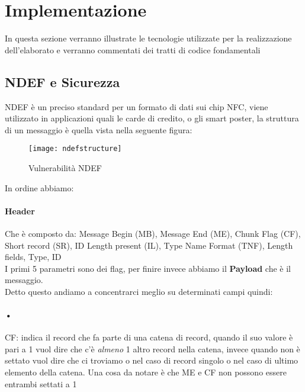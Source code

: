 \section{Implementazione}

\hspace{\parindent}In questa sezione verranno illustrate le tecnologie utilizzate per la realizzazione dell'elaborato e verranno commentati dei tratti di codice fondamentali
\subsection{NDEF e Sicurezza}
\hspace{\parindent}NDEF è un preciso standard per un formato di dati sui chip NFC, viene utilizzato in applicazioni quali le carde di credito, o gli smart poster, la struttura di un messaggio è quella vista nella seguente figura: 
\begin{figure}[h]
\begin{center}
\texttt{[image: ndefstructure]}
\caption[NDEF Vulnerabilità]{Vulnerabilità NDEF\footnotemark}
\end{center}
\end{figure}
In ordine abbiamo: 
\paragraph{Header}
Che è composto da: Message Begin (MB), Message End (ME), Chunk Flag (CF), Short record (SR), ID Length present (IL), Type Name Format (TNF), Length fields, Type, ID
\\I primi 5 parametri sono dei flag, per finire invece abbiamo il \textbf{Payload} che è il messaggio.
\\Detto questo andiamo a concentrarci meglio su determinati campi quindi:
\paragraph{•}CF: indica il record che fa parte di una catena di record, quando il suo valore è pari a 1 vuol dire che c'è \textit{almeno} 1 altro record nella catena, invece quando non è settato vuol dire che ci troviamo o nel caso di record singolo o nel caso di ultimo elemento della catena. Una cosa da notare è che ME e CF non possono essere entrambi settati a 1
